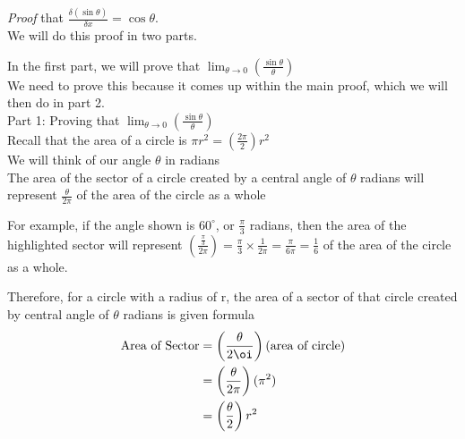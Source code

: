 \documentclass{article}
\begin{document}
\textit{Proof} that $\frac{\delta (\sin \theta)}{\delta x}=\cos \theta$.\\
We will do this proof in two parts. 


In the first part, we will prove that  $\lim_{\theta \to 0}\left( \frac{\sin \theta }{\theta}\right)$\\

We need to prove this because it comes up within the main proof, which we will then do in part 2.\\

Part 1: Proving that $\lim_{\theta \to 0}\left( \frac{\sin \theta }{\theta}\right)$\\

Recall that the area of a circle is $\pi r^2=(\frac{2 \pi}{2})r^2$ \\
We will think of our angle $\theta$ in radians \\
The area of the sector of a circle created by a central angle of $\theta$ radians will represent $\frac{\theta}{2\pi}$ of the area of the circle as a whole \\

\begin{minipage}{0.5\textwidth}
For example, if the angle shown is $60^{\circ}$, or $\frac{\pi}{3}$ radians, then the area of the highlighted sector will represent $\left(\frac{\frac{\pi}{3}}{2\pi}\right)=\frac{\pi}{3}\times \frac{1}{2\pi}=\frac{\pi}{6\pi}=\frac{1}{6}$ of the area of the circle as a whole.
\end{minipage}
\hspace{1em}
\begin{minipage}{0.5\textwidth}
\end{minipage}

\hspace{1em}


Therefore, for a circle with a radius of r, the area of a sector of that circle created by central angle of $\theta$ radians is given formula \\

\begin{align*}
    \text{Area of Sector} &= \left(\frac{\theta}{2 \oi}\right )(\text{area of circle})\\
    &=\left(\frac{\theta}{2 \pi}\right)(\pi ^2)\\
    &=\left(\frac{\theta}{2}\right)r^2
\end{align*}
\end{document}
